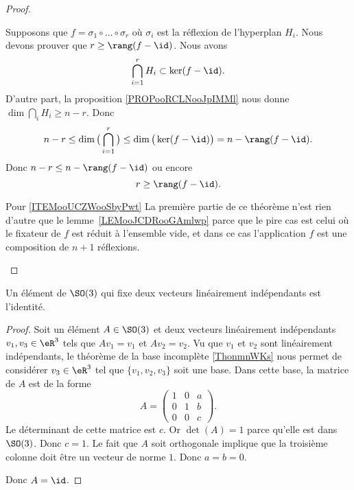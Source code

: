 \begin{proof}
\begin{subproof}
            Supposons que \( f=\sigma_1\circ\ldots \circ \sigma_r\) où \( \sigma_i\) est la réflexion de l'hyperplan \( H_i\). Nous devons prouver que \( r\geq \rang(f-\id)\). Nous avons
            \begin{equation}
                \bigcap_{i=1}^rH_i\subset \ker(f-\id).
            \end{equation}
            D'autre part, la proposition \ref{PROPooRCLNooJpIMMl} nous donne \( \dim\bigcap_iH_i\geq n-r\). Donc
            \begin{equation}
                n-r\leq \dim\big( \bigcap_{i=1}^r \big)\leq\dim\big( \ker(f-\id) \big)=n-\rang(f-\id).
            \end{equation}
            Donc \( n-r\leq n-\rang(f-\id)\) ou encore
            \begin{equation}
                r\geq \rang(f-\id).
            \end{equation}

        \item[Pour \ref{ITEMooUCZWooSbyPwt}]
    La première partie de ce théorème n'est rien d'autre que le lemme~\ref{LEMooJCDRooGAmlwp} parce que le pire cas est celui où le fixateur de \( f\) est réduit à l'ensemble vide, et dans ce cas l'application \( f\) est une composition de \( n+1\) réflexions.
        \end{subproof}
\end{proof}

\begin{proposition}     \label{PROPooUSKEooUbNVfs}
    Un élément de \( \SO(3)\) qui fixe deux vecteurs linéairement indépendants est l'identité.
\end{proposition}

\begin{proof}
    Soit un élément \( A\in \SO(3)\) et deux vecteurs linéairement indépendants \( v_1,v_3\in \eR^3\) tels que \( Av_1=v_1\) et \( Av_2=v_2\). Vu que \( v_1\) et \( v_2\) sont linéairement indépendants, le théorème de la base incomplète \ref{ThonmnWKs} nous permet de considérer \( v_3\in \eR^3\) tel que \( \{ v_1,v_2,v_3 \}\) soit une base. Dans cette base, la matrice de \( A\) est de la forme
    \begin{equation}
        A=\begin{pmatrix}
            1    &   0    &   a    \\
            0    &   1    &   b    \\
            0    &   0    &   c
        \end{pmatrix}.
    \end{equation}
    Le déterminant de cette matrice est \( c\). Or \( \det(A)=1\) parce qu'elle est dans \( \SO(3)\). Donc \( c=1\). Le fait que \( A\) soit orthogonale implique que la troisième colonne doit être un vecteur de norme \( 1\). Donc \( a=b=0\).

    Donc \( A=\id\).
\end{proof}

